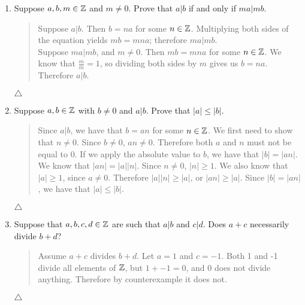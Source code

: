 \documentclass{hw}
\begin{document}
\begin{enumerate}
\item Suppose $a,b,m\in\mathbb{Z}$ and $m\neq 0$. Prove that $a|b$ if and only if $ma|mb$.
\begin{quote}
Suppose $a|b$. Then $b = na$ for some $n\in\mathbb{Z}$. Multiplying both sides of the equation yields
$mb = mna$; therefore $ma|mb$.\\
Suppose $ma|mb$, and $m\neq 0$. Then $mb = mna$ for some $n\in\mathbb{Z}$. We know that $\frac{m}{m} = 1$, so
dividing both sides by $m$ gives us $b = na$. Therefore $a|b$.
\end{quote}
$\triangle$

\item Suppose $a,b\in\mathbb{Z}$ with $b\neq 0$ and $a|b$. Prove that $|a| \leq |b|$.
\begin{quote}
Since $a|b$, we have that $b=an$ for some $n\in\mathbb{Z}$. We first need to show that $n \neq 0$.
Since $b\neq 0$, $an\neq 0$. Therefore both $a$ and $n$ must not be equal to 0. If we apply
the absolute value to $b$, we have that $|b| = |an|$. We know that $|an| = |a||n|$. Since
$n\neq 0$, $|n| \geq 1$. We also know that $|a| \geq 1$, since $a\neq 0$. Therefore
$|a||n| \geq |a|$, or $|an| \geq |a|$. Since $|b| = |an|$, we have that $|a|\leq|b|$.
\end{quote}
$\triangle$

\item Suppose that $a,b,c,d\in\mathbb{Z}$ are such that $a|b$ and $c|d$. Does $a+c$ necessarily
divide $b+d$?
\begin{quote}
Assume $a+c$ divides $b+d$. Let $a=1$ and $c=-1$. Both 1 and -1 divide all elements of $\mathbb{Z}$, but
$1 + -1 = 0$, and 0 does not divide anything. Therefore by counterexample it does not.
\end{quote}
$\triangle$


\end{enumerate}
\end{document}
